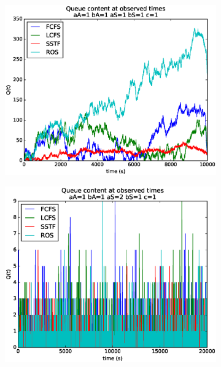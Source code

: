 \documentclass[a4paper]{article}
\begin{document}
\begin{figure}[H]
\begin{subfigure}{.5\textwidth}
  \centering
  \includegraphics[width=\linewidth]{../figures/queue_content11111}
  \label{fig:qc}
\end{subfigure}
\begin{subfigure}{.5\textwidth}
  \centering
  \includegraphics[width=\linewidth]{../figures/queue_content11211}
  \label{fig:qca}
\end{subfigure}
\end{figure}
\end{document}
